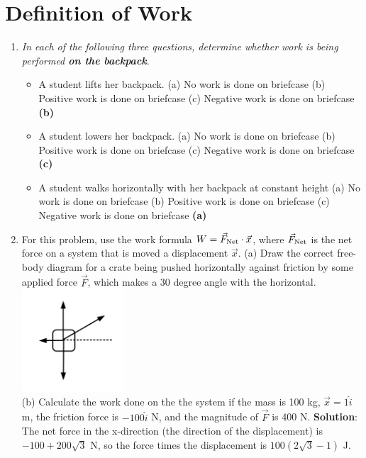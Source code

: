 \documentclass[10pt]{article}
\begin{document}
\maketitle

\section{Definition of Work}
\begin{enumerate}
\item \textit{In each of the following three questions, determine whether work is being performed \textbf{on the backpack}}.
\begin{itemize}
\item A student lifts her backpack. (a) No work is done on briefcase (b) Positive work is done on briefcase (c) Negative work is done on briefcase \textbf{(b)}
\item A student lowers her backpack.  (a) No work is done on briefcase (b) Positive work is done on briefcase (c) Negative work is done on briefcase \textbf{(c)}
\item A student walks horizontally with her backpack at constant height  (a) No work is done on briefcase (b) Positive work is done on briefcase (c) Negative work is done on briefcase \textbf{(a)}
\end{itemize}
\item For this problem, use the work formula $W = \vec{F}_{\rm Net} \cdot \vec{x}$, where $\vec{F}_{\rm Net}$ is the net force on a system that is moved a displacement $\vec{x}$.  (a) Draw the correct free-body diagram for a crate being pushed horizontally against friction by some applied force $\vec{F}$, which makes a 30 degree angle with the horizontal.  \\
\includegraphics[width=0.3\textwidth]{figures/FBD1.pdf} \\
(b) Calculate the work done on the the system if the mass is 100 kg, $\vec{x} = 1 \hat{i}$ m, the friction force is $-100\hat{i}$ N, and the magnitude of $\vec{F}$ is 400 N. \textbf{Solution}: The net force in the x-direction (the direction of the displacement) is $-100 + 200\sqrt{3}$ N, so the force times the displacement is $100(2\sqrt{3}-1)$ J.
\end{enumerate}
\end{document}
